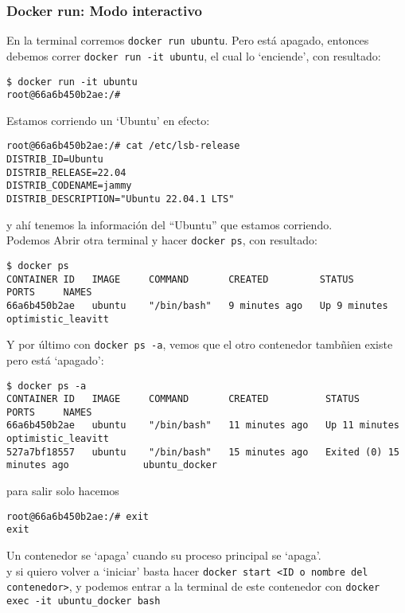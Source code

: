 \documentclass{article}
\begin{document}
\subsubsection{Docker run: Modo interactivo}
En la terminal corremos \lstinline{docker run ubuntu}. Pero está apagado, entonces debemos correr \lstinline{docker run -it ubuntu}, el cual lo \enquote*{enciende}, con resultado:
\begin{lstlisting}[numbers=none]
$ docker run -it ubuntu
root@66a6b450b2ae:/# 
\end{lstlisting}
Estamos corriendo un \enquote*{Ubuntu}
en efecto:
\begin{lstlisting}[numbers=none]
root@66a6b450b2ae:/# cat /etc/lsb-release 
DISTRIB_ID=Ubuntu
DISTRIB_RELEASE=22.04
DISTRIB_CODENAME=jammy
DISTRIB_DESCRIPTION="Ubuntu 22.04.1 LTS"      
\end{lstlisting}
y ahí tenemos la información del \enquote{Ubuntu} que estamos corriendo.\\
Podemos Abrir otra terminal y hacer \lstinline{docker ps}, con resultado:
\begin{lstlisting}[numbers=none]
$ docker ps
CONTAINER ID   IMAGE     COMMAND       CREATED         STATUS         PORTS     NAMES
66a6b450b2ae   ubuntu    "/bin/bash"   9 minutes ago   Up 9 minutes             optimistic_leavitt
\end{lstlisting}
Y por último con \lstinline{docker ps -a}, vemos que el otro contenedor tambñien existe pero está \enquote*{apagado}:
\begin{lstlisting}[numbers=none]
$ docker ps -a
CONTAINER ID   IMAGE     COMMAND       CREATED          STATUS                      PORTS     NAMES
66a6b450b2ae   ubuntu    "/bin/bash"   11 minutes ago   Up 11 minutes                         optimistic_leavitt
527a7bf18557   ubuntu    "/bin/bash"   15 minutes ago   Exited (0) 15 minutes ago             ubuntu_docker
\end{lstlisting}
para salir solo hacemos 
\begin{lstlisting}[numbers=none]
root@66a6b450b2ae:/# exit
exit
\end{lstlisting}
Un contenedor se \enquote*{apaga} cuando su proceso principal se \enquote*{apaga}.\\
y si quiero volver a \enquote*{iniciar} basta hacer \lstinline{docker start <ID o nombre del contenedor>}, y podemos entrar a la terminal de este contenedor con \lstinline{docker exec -it ubuntu_docker bash}
\end{document}
